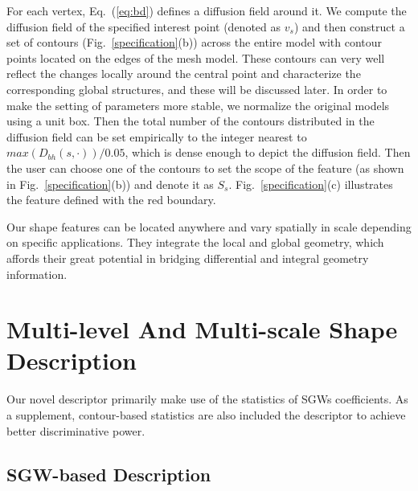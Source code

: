 For each vertex, Eq.~(\ref{eq:bd}) defines a diffusion field around
it. We compute the diffusion field of the specified interest point
(denoted as $v_s$) and then construct a set of contours
(Fig.~\ref{specification}(b)) across the entire model with contour
points located on the edges of the mesh model. These contours can very
well reflect the changes locally around the central point and
characterize the corresponding global structures, and these will be
discussed later. In order to make the setting of parameters more
stable, we normalize the original models using a unit box. Then the
total number of the contours distributed in the diffusion field can be
set empirically to the integer nearest to $max(D_{bh}(s,\cdot))/0.05$,
which is dense enough to depict the diffusion field. Then the user can
choose one of the contours to set the scope of the feature (as shown
in Fig.~\ref{specification}(b)) and denote it as $S_{s}$.
Fig.~\ref{specification}(c) illustrates the feature defined with the
red boundary.

Our shape features can be located anywhere and vary spatially in scale
depending on specific applications. They integrate the local and global
geometry, which affords their great potential in bridging differential
and integral geometry information.

\section{Multi-level And Multi-scale Shape Description}
\label{sec:Des}

Our novel descriptor primarily make use of the statistics
of SGWs coefficients. As a supplement, contour-based statistics are also
included the descriptor to achieve better discriminative power.  

\subsection{SGW-based Description}

